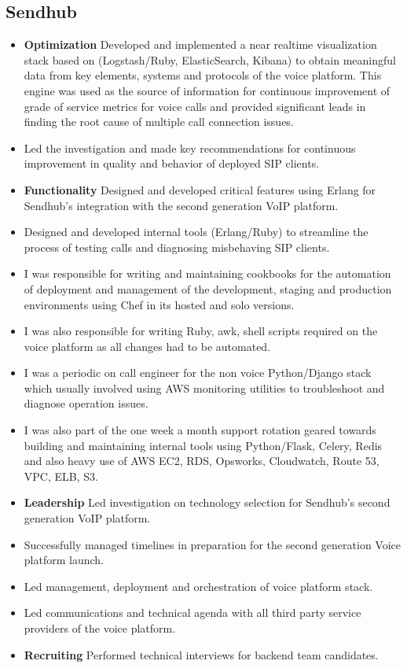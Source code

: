 \documentclass[11pt,a4paper,sans]{moderncv}   %
\begin{document}
\subsection{Sendhub}
  \begin{itemize}
  \item \textbf{Optimization} Developed and implemented a near realtime visualization stack based on (Logstash/Ruby, ElasticSearch, Kibana) to obtain meaningful data from  key elements, systems and protocols of the voice platform. This engine was used as the source of information for continuous improvement of grade of service metrics for voice calls and provided significant leads in finding the root cause of multiple call connection issues.
   \item Led the investigation and made key recommendations for continuous improvement in quality and behavior of deployed SIP clients.
   \item \textbf{Functionality} Designed and developed critical features using Erlang for Sendhub's integration with the second generation VoIP platform.
   \item Designed and developed internal tools (Erlang/Ruby) to streamline the process of testing calls and diagnosing misbehaving SIP clients.
   \item I was responsible for writing and maintaining cookbooks for the automation of deployment and  management of the development, staging and production environments using Chef in its hosted and solo versions.
   \item I was also responsible for writing Ruby, awk, shell scripts required on the voice platform as all changes had to be automated.
   \item I was a periodic on call engineer for the non voice Python/Django stack which usually involved using AWS monitoring utilities to troubleshoot and diagnose operation issues.
   \item I was also part of the one week a month support rotation geared towards building and maintaining internal tools using Python/Flask, Celery, Redis and also heavy use of AWS EC2, RDS, Opsworks, Cloudwatch, Route 53, VPC, ELB, S3.
  \item \textbf{Leadership} Led investigation on technology selection for Sendhub's second generation VoIP platform.
  \item Successfully managed timelines in preparation for the second generation Voice platform launch.
  \item Led management, deployment and orchestration of voice platform stack.
  \item Led communications and technical agenda with all third party service providers of the voice platform.
  \item \textbf{Recruiting} Performed technical interviews for backend team candidates.
\end{itemize}
\end{document}
